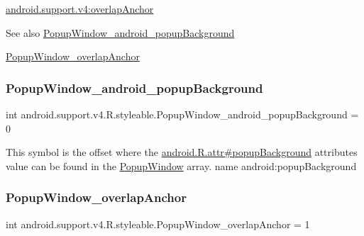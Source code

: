 {\ttfamily \hyperlink{classandroid_1_1support_1_1v4_1_1R_1_1styleable_a5c26831300739afea25f9941395ae022}{android.\+support.\+v4\+:overlap\+Anchor}}

\begin{DoxySeeAlso}{See also}
\hyperlink{classandroid_1_1support_1_1v4_1_1R_1_1styleable_a8d0ba5d280ce722ccd8a262e5a5a70ac}{Popup\+Window\+\_\+android\+\_\+popup\+Background} 

\hyperlink{classandroid_1_1support_1_1v4_1_1R_1_1styleable_a5c26831300739afea25f9941395ae022}{Popup\+Window\+\_\+overlap\+Anchor} 
\end{DoxySeeAlso}
\mbox{\label{classandroid_1_1support_1_1v4_1_1R_1_1styleable_a8d0ba5d280ce722ccd8a262e5a5a70ac}} 
\subsubsection{\texorpdfstring{Popup\+Window\+\_\+android\+\_\+popup\+Background}{PopupWindow\_android\_popupBackground}}
{\footnotesize\ttfamily int android.\+support.\+v4.\+R.\+styleable.\+Popup\+Window\+\_\+android\+\_\+popup\+Background = 0\hspace{0.3cm}{\ttfamily [static]}}

This symbol is the offset where the \hyperlink{}{android.\+R.\+attr\#popup\+Background} attribute\textquotesingle{}s value can be found in the \hyperlink{classandroid_1_1support_1_1v4_1_1R_1_1styleable_ac336c55ce0f18f8d06778e7eab7b5f62}{Popup\+Window} array.  name android\+:popup\+Background \mbox{\label{classandroid_1_1support_1_1v4_1_1R_1_1styleable_a5c26831300739afea25f9941395ae022}} 
\subsubsection{\texorpdfstring{Popup\+Window\+\_\+overlap\+Anchor}{PopupWindow\_overlapAnchor}}
{\footnotesize\ttfamily int android.\+support.\+v4.\+R.\+styleable.\+Popup\+Window\+\_\+overlap\+Anchor = 1\hspace{0.3cm}{\ttfamily [static]}}

